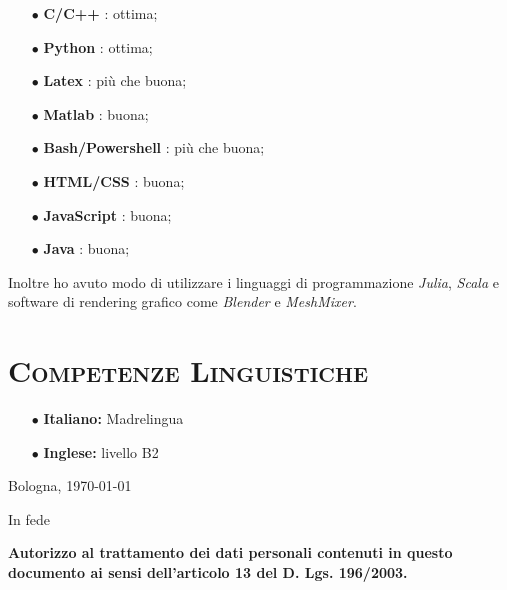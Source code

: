 \documentclass[a4paper,11pt]{article}
\newcommand\SignatureImage[2][]{%
  \IfFileExists{#2}{%
    \texttt{[image: \#2]}%
  }{%
    \hfill\makebox[2.0in]{\hrulefill}
  }%
}%
\begin{document}
\begin{itemize}

  \item[$\bullet$] \textbf{C/C++} : ottima;

  \item[$\bullet$] \textbf{Python} : ottima;

  \item[$\bullet$] \textbf{Latex} : più che buona;

  \item[$\bullet$] \textbf{Matlab} : buona;

  \item[$\bullet$] \textbf{Bash/Powershell} : più che buona;

  \item[$\bullet$] \textbf{HTML/CSS} : buona;

  \item[$\bullet$] \textbf{JavaScript} : buona;

  \item[$\bullet$] \textbf{Java} : buona;

\end{itemize}

Inoltre ho avuto modo di utilizzare i linguaggi di programmazione \emph{Julia}, \emph{Scala} e software di rendering grafico come \emph{Blender} e \emph{MeshMixer}.


\vspace*{0.5cm}
\section*{\scshape{Competenze Linguistiche}}

\begin{itemize}

  \item[$\bullet$]\textbf{Italiano:} Madrelingua

  \item[$\bullet$]\textbf{Inglese:} livello B2

\end{itemize}


\vspace*{0.5cm}
\quad


\begin{flushright}
Bologna, \today

In fede

\vspace*{0.5cm}

\begin{figure}[h!]
  \begin{flushright}
    \SignatureImage[scale=0.5]{Firma.png}
  \end{flushright}
\end{figure}

\end{flushright}

\vspace*{\fill}
\textbf{Autorizzo al trattamento dei dati personali contenuti in questo documento ai sensi dell'articolo 13 del D. Lgs. 196/2003.}
\end{document}
